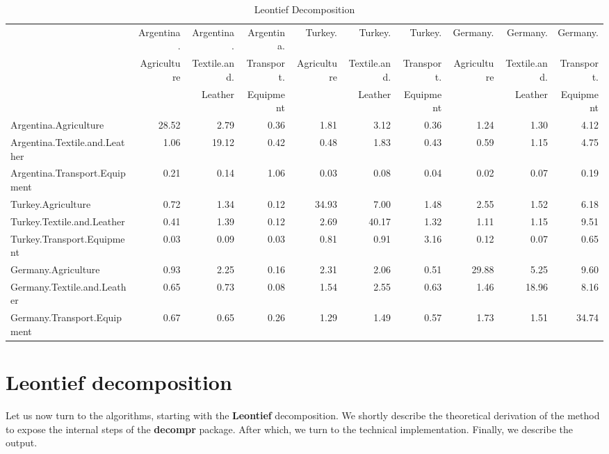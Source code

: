 \documentclass[a4paper]{article}\usepackage[]{graphicx}\usepackage[]{color}
\begin{document}
\begin{landscape}
\begin{table}[htbp]
  \caption{Leontief Decomposition}
  \label{tab:leon}
  \begin{tabular}{lrrrrrrrrr}
    \hline
          & Argentina. & Argentina. & Argentina. & Turkey. & Turkey. & Turkey. & Germany. & Germany. & Germany.\\
          & Agriculture & Textile.and. & Transport. & Agriculture & Textile.and. & Transport. & Agriculture & Textile.and. & Transport.\\
          & & Leather & Equipment & & Leather & Equipment & & Leather & Equipment\\
    \hline
    Argentina.Agriculture & 28.52 & 2.79  & 0.36  & 1.81  & 3.12  & 0.36  & 1.24  & 1.30  & 4.12 \\
    Argentina.Textile.and.Leather & 1.06  & 19.12 & 0.42  & 0.48  & 1.83  & 0.43  & 0.59  & 1.15  & 4.75 \\
    Argentina.Transport.Equipment & 0.21  & 0.14  & 1.06  & 0.03  & 0.08  & 0.04  & 0.02  & 0.07  & 0.19 \\
    Turkey.Agriculture & 0.72  & 1.34  & 0.12  & 34.93 & 7.00  & 1.48  & 2.55  & 1.52  & 6.18 \\
    Turkey.Textile.and.Leather & 0.41  & 1.39  & 0.12  & 2.69  & 40.17 & 1.32  & 1.11  & 1.15  & 9.51 \\
    Turkey.Transport.Equipment & 0.03  & 0.09  & 0.03  & 0.81  & 0.91  & 3.16  & 0.12  & 0.07  & 0.65 \\
    Germany.Agriculture & 0.93  & 2.25  & 0.16  & 2.31  & 2.06  & 0.51  & 29.88 & 5.25  & 9.60 \\
    Germany.Textile.and.Leather & 0.65  & 0.73  & 0.08  & 1.54  & 2.55  & 0.63  & 1.46  & 18.96 & 8.16 \\
    Germany.Transport.Equipment & 0.67  & 0.65  & 0.26  & 1.29  & 1.49  & 0.57  & 1.73  & 1.51  & 34.74 \\
    \hline
    \end{tabular}

\end{table}
\end{landscape}


\section{Leontief decomposition}
\label{sec:leontief}
Let us now turn to the algorithms, starting with the \textbf{Leontief} decomposition. We shortly describe the theoretical
derivation of the method to expose the internal steps of the \textbf{decompr} package. After which, we turn to the technical implementation.
Finally, we describe the output.
\end{document}
